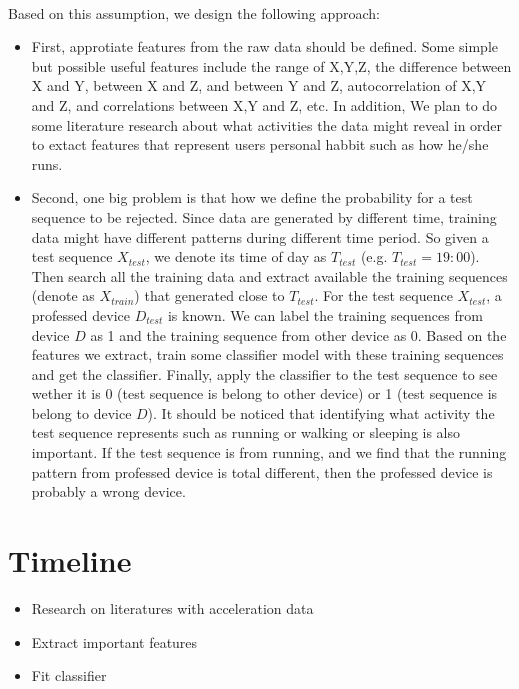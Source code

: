 \documentclass{article}
\begin{document}
	\paragraph{} Based on this assumption, we design the following approach:
	\begin{itemize}
		\item First, approtiate features from the raw data should be defined. Some simple but possible useful features include the range of X,Y,Z, the difference between X and Y, between X and Z, and between Y and Z, autocorrelation of X,Y and Z, and correlations between X,Y and Z, etc. In addition, We plan to do some literature research about what activities the data might reveal in order to extact features that represent users personal habbit such as how he/she runs. 
		\item Second, one big problem is that how we define the probability for a test sequence to be rejected. Since data are generated by different time, training data might have different patterns during different time period. So given a test sequence $X_{test}$, we denote its time of day as $T_{test}$ (e.g. $T_{test}=19:00$). Then search all the training data and extract available the training sequences (denote as $X_{train}$) that generated close to $T_{test}$. For the test sequence $X_{test}$, a professed device $D_{test}$ is known. We can label the training sequences from device $D$ as 1 and the training sequence from other device as 0. Based on the features we extract, train some classifier model with these training sequences and get the classifier. Finally, apply the classifier to the test sequence to see wether it is 0 (test sequence is belong to other device) or 1 (test sequence is belong to device $D$). It should be noticed that identifying what activity the test sequence represents such as running or walking or sleeping is also important. If the test sequence is from running, and we find that the running pattern from professed device is total different, then the professed device is probably a wrong device. 
		
	\end{itemize}
	
	\section{Timeline} %
	\label{sec:timeline}
	\begin{itemize}
		\item Research on literatures with acceleration data 
		\item Extract important features
		\item Fit classifier
	\end{itemize}
	
	
\end{document}
